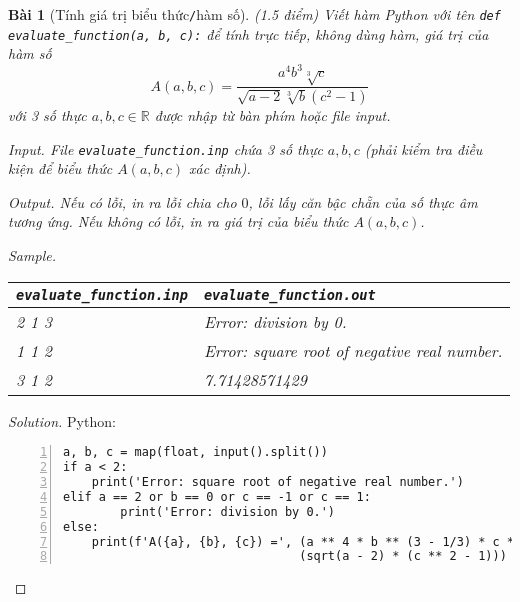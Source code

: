 \documentclass{article}
\newtheorem{baitoan}{Bài}
\begin{document}
\begin{baitoan}[Tính giá trị biểu thức{\tt/}hàm số]
	{\rm(1.5 điểm)} Viết hàm Python với tên \verb|def evaluate_function(a, b, c):| để tính trực tiếp, không dùng hàm, giá trị của hàm số
	\begin{equation*}
		A(a,b,c) = \frac{a^4b^3\sqrt[3]{c}}{\sqrt{a - 2}\sqrt[3]{b}(c^2 - 1)}
	\end{equation*}
	với 3 số thực $a,b,c\in\mathbb{R}$ được nhập từ bàn phím hoặc file input.
	\item {\sf Input.} File \verb|evaluate_function.inp| chứa 3 số thực $a,b,c$ (phải kiểm tra điều kiện để biểu thức $A(a,b,c)$ xác định).
	\item {\sf Output.} Nếu có lỗi, in ra lỗi chia cho $0$, lỗi lấy căn bậc chẵn của số thực âm tương ứng. Nếu không có lỗi, in ra giá trị của biểu thức $A(a,b,c)$.
	\item {\sf Sample.}
	\begin{table}[H]
		\centering
		\begin{tabular}{|l|l|}
			\hline
			\verb|evaluate_function.inp| & \verb|evaluate_function.out| \\
			\hline
			2 1 3 & Error: division by 0. \\
			1 1 2 & Error: square root of negative real number. \\
			3 1 2 & 7.71428571429 \\
			\hline
		\end{tabular}
	\end{table}
\end{baitoan}

\begin{proof}[Solution]
    Python:
    \begin{Verbatim}[numbers=left,xleftmargin=5mm]
a, b, c = map(float, input().split())
if a < 2:
	print('Error: square root of negative real number.')
elif a == 2 or b == 0 or c == -1 or c == 1:
		print('Error: division by 0.')
else:
	print(f'A({a}, {b}, {c}) =', (a ** 4 * b ** (3 - 1/3) * c ** (1/3)) /
                                 (sqrt(a - 2) * (c ** 2 - 1)))
    \end{Verbatim}
\end{proof}
\end{document}
